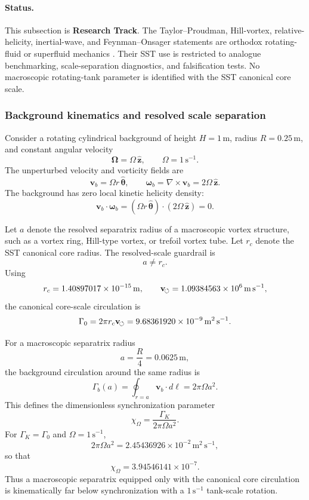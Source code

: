 \paragraph{Status.}
This subsection is \textbf{Research Track}.  The Taylor--Proudman,
Hill-vortex, relative-helicity, inertial-wave, and Feynman--Onsager statements
are orthodox rotating-fluid or superfluid mechanics
\cite{Proudman1916,Taylor1922,Batchelor1967,Greenspan1968,Hill1894,Onsager1949,Feynman1955}.
Their SST use is restricted to analogue benchmarking, scale-separation
diagnostics, and falsification tests.  No macroscopic rotating-tank parameter is
identified with the SST canonical core scale.

\subsubsection{Background kinematics and resolved scale separation}

Consider a rotating cylindrical background of height
\(H=1\,\mathrm m\), radius \(R=0.25\,\mathrm m\), and constant angular velocity
\[
\boldsymbol{\Omega}=\Omega\,\hat{\mathbf z},
\qquad
\Omega=1\,\mathrm{s^{-1}}.
\]
The unperturbed velocity and vorticity fields are
\[
\mathbf v_b=\Omega r\,\hat{\boldsymbol\theta},
\qquad
\boldsymbol\omega_b=\nabla\times\mathbf v_b
=2\Omega\,\hat{\mathbf z}.
\]
The background has zero local kinetic helicity density:
\[
\mathbf v_b\cdot\boldsymbol\omega_b
=(\Omega r\,\hat{\boldsymbol\theta})\cdot(2\Omega\,\hat{\mathbf z})=0.
\]

Let \(a\) denote the resolved separatrix radius of a macroscopic vortex
structure, such as a vortex ring, Hill-type vortex, or trefoil vortex tube.
Let \(r_c\) denote the SST canonical core radius.  The resolved-scale guardrail is
\[
\boxed{a\neq r_c.}
\]
Using
\[
r_c=1.40897017\times10^{-15}\,\mathrm m,
\qquad
\mathbf{v}_{\!\boldsymbol{\circlearrowleft}}=1.09384563\times10^6\,\mathrm{m\,s^{-1}},
\]
the canonical core-scale circulation is
\[
\Gamma_0=2\pi r_c\mathbf{v}_{\!\boldsymbol{\circlearrowleft}}
=9.68361920\times10^{-9}\,\mathrm{m^2\,s^{-1}}.
\]

For a macroscopic separatrix radius
\[
a=\frac{R}{4}=0.0625\,\mathrm m,
\]
the background circulation around the same radius is
\[
\Gamma_b(a)=\oint_{r=a}\mathbf v_b\cdot d\boldsymbol\ell
=2\pi\Omega a^2.
\]
This defines the dimensionless synchronization parameter
\[
\boxed{
\chi_\Omega=\frac{\Gamma_K}{2\pi\Omega a^2}.
}
\]
For \(\Gamma_K=\Gamma_0\) and \(\Omega=1\,\mathrm{s^{-1}}\),
\[
2\pi\Omega a^2=2.45436926\times10^{-2}\,\mathrm{m^2\,s^{-1}},
\]
so that
\[
\boxed{
\chi_\Omega=3.94546141\times10^{-7}.
}
\]
Thus a macroscopic separatrix equipped only with the canonical core circulation
is kinematically far below synchronization with a \(1\,\mathrm{s^{-1}}\)
tank-scale rotation.

